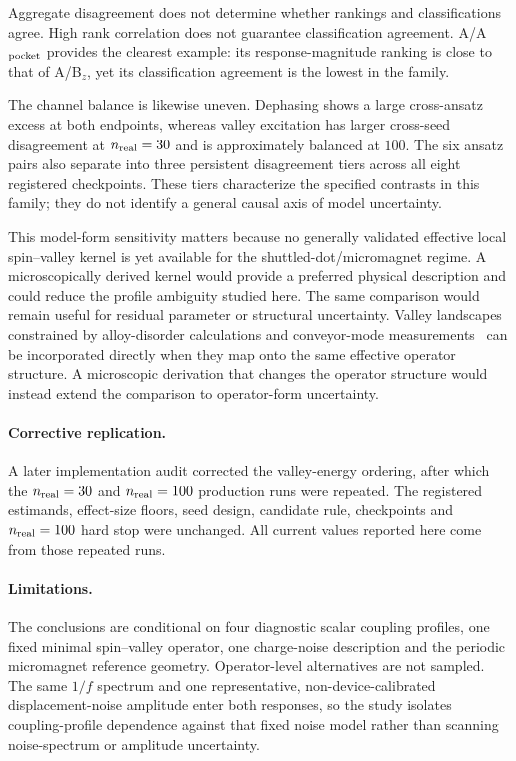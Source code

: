\documentclass[aip,jap,reprint,superscriptaddress,longbibliography,floatfix]{revtex4-2}
\begin{document}
Aggregate disagreement does not determine whether rankings and classifications
agree. High rank correlation does not guarantee classification agreement.
A/A$_{\rm pocket}$ provides the clearest example: its response-magnitude
ranking is close to that of A/B$_z$, yet its classification agreement is the
lowest in the family.

The channel balance is likewise uneven. Dephasing shows a large cross-ansatz
excess at both endpoints, whereas valley excitation has larger cross-seed
disagreement at $n_{\rm real}=30$ and is approximately balanced at $100$. The
six ansatz pairs also separate into three persistent disagreement tiers across
all eight registered checkpoints. These tiers characterize the specified
contrasts in this family; they do not identify a general causal axis of model
uncertainty.

This model-form sensitivity matters because no generally validated effective
local spin--valley kernel is yet available for the shuttled-dot/micromagnet
regime. A microscopically derived kernel would provide a preferred physical
description and could reduce the profile ambiguity studied here. The same comparison would
remain useful for residual parameter or structural uncertainty. Valley
landscapes constrained by alloy-disorder calculations and conveyor-mode
measurements~\cite{paquelet_wuetz_atomic_2022,losert_practical_2023,volmer_mapping_2024}
can be incorporated directly when they map onto the same effective operator
structure. A microscopic derivation that changes the operator structure would
instead extend the comparison to operator-form uncertainty.

\paragraph{Corrective replication.}
A later implementation audit corrected the valley-energy ordering, after which
the $n_{\rm real}=30$ and $n_{\rm real}=100$ production runs were repeated.
The registered estimands, effect-size floors, seed design, candidate rule,
checkpoints and $n_{\rm real}=100$ hard stop were unchanged. All current values
reported here come from those repeated runs.

\paragraph{Limitations.}
The conclusions are conditional on four diagnostic scalar coupling profiles,
one fixed minimal spin--valley operator, one charge-noise description and the
periodic micromagnet reference geometry. Operator-level alternatives are not
sampled. The same $1/f$ spectrum and one representative,
non-device-calibrated displacement-noise amplitude enter both responses, so the
study isolates coupling-profile dependence against that fixed noise model
rather than scanning noise-spectrum or amplitude uncertainty.
\end{document}
